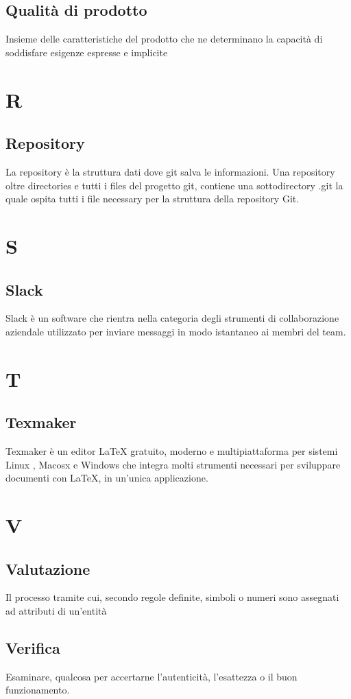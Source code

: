 \documentclass[11pt,a4paper]{article}
\begin{document}
	\subsection{Qualità di prodotto}
	Insieme delle caratteristiche del prodotto che ne determinano la capacità di soddisfare esigenze espresse e implicite
	\section{R}
	\subsection{Repository}
	La repository è la struttura dati dove git salva le informazioni. Una repository oltre directories e tutti i files del progetto git, contiene una sottodirectory .git la quale ospita tutti i file necessary per la struttura della repository Git.

	\section{S}
	\subsection{Slack}
	Slack è un software che rientra nella categoria degli strumenti di collaborazione aziendale utilizzato per inviare messaggi in modo istantaneo ai membri del team.
	\section{T}
	\subsection{Texmaker}
	Texmaker è un editor LaTeX gratuito, moderno e multipiattaforma per sistemi Linux , Macosx e Windows che integra molti strumenti necessari per sviluppare documenti con LaTeX, in un'unica applicazione. 
	
	\section{V}
	\subsection{Valutazione}
	Il processo tramite cui, secondo regole definite, simboli o numeri sono assegnati ad attributi di un’entità
	\subsection{Verifica}
	Esaminare, qualcosa per accertarne l’autenticità, l’esattezza o il buon funzionamento.
	
	
\end{document}

